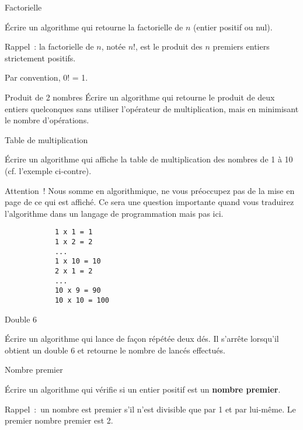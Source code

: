 	\begin{Exercice}{Factorielle}

		Écrire un algorithme qui retourne la factorielle de $n$ (entier positif ou
		nul). 
		
		Rappel~: la factorielle de $n$, notée $n$!, est le produit des $n$
		premiers entiers strictement positifs. 

		Par convention, 0! = 1.
	\end{Exercice}

	\begin{Exercice}{Produit de 2 nombres}
		Écrire un algorithme qui retourne le produit de deux entiers quelconques
		sans utiliser l’opérateur de multiplication, mais en minimisant le
		nombre d’opérations.
	\end{Exercice}

	\begin{Exercice}{Table de multiplication}

		\begin{minipage}[t]{10cm}
			Écrire un algorithme qui affiche la table de multiplication
			des nombres de 1 à 10
			(cf. l’exemple ci-contre).

			\medskip
			Attention~! Nous somme en algorithmique, 
			ne vous préoccupez pas de la mise en page de ce qui est affiché.
			Ce sera une question importante quand vous traduirez 
			l’algorithme dans un langage de programmation mais pas ici. 
		\end{minipage}
		\qquad
		\begin{minipage}[t]{4cm}
			\begin{verbatim}
			1 x 1 = 1
			1 x 2 = 2
			...
			1 x 10 = 10
			2 x 1 = 2
			...
			10 x 9 = 90
			10 x 10 = 100
			\end{verbatim}
		\end{minipage}		
	\end{Exercice}

	\begin{Exercice}{Double 6}

		Écrire un algorithme qui lance de façon répétée deux dés.
		Il s’arrête lorsqu’il obtient un double 6
		et retourne le nombre de lancés effectués.
	\end{Exercice}

	\begin{Exercice}{Nombre premier}

		Écrire un algorithme qui vérifie si un entier positif est un
		\textbf{nombre premier}. 

		Rappel~:~un nombre est premier s’il n’est divisible que par 1 et par
		lui-même. Le premier nombre premier est 2.
	\end{Exercice}

